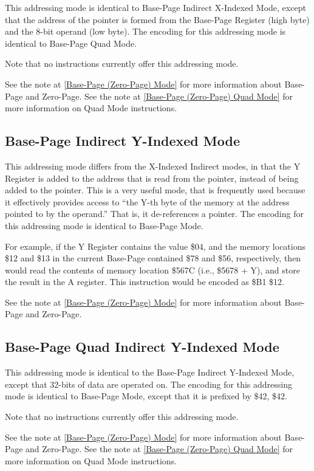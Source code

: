 This addressing mode is identical to Base-Page Indirect X-Indexed Mode, except that the address
of the pointer is formed from the Base-Page Register (high byte) and the 8-bit operand (low byte).
The encoding for this addressing mode is identical to Base-Page Quad Mode.

Note that no instructions currently offer this addressing mode.

See the note at \ref{Base-Page (Zero-Page) Mode} for more information about Base-Page and Zero-Page.
See the note at \ref{Base-Page (Zero-Page) Quad Mode} for more information on Quad Mode instructions.

\subsection{Base-Page Indirect Y-Indexed Mode}

This addressing mode differs from the X-Indexed Indirect modes, in that the Y Register is
added to the address that is read from the pointer, instead of being added to the pointer.
This is a very useful mode, that is frequently used because it effectively provides access to
``the Y-th byte of the memory at the address pointed to by the operand.'' That is, it de-references
a pointer.  
The encoding for this addressing mode is identical to Base-Page Mode.

For example, if the Y Register contains the value \$04, and the memory locations \$12 and \$13 in the current
Base-Page contained \$78 and \$56, respectively,
then  would read the contents of memory location \$567C (i.e., \$5678 + Y),
and store the result in the A register. This instruction would be encoded as \$B1 \$12.

See the note at \ref{Base-Page (Zero-Page) Mode} for more information about Base-Page and Zero-Page.

\subsection{Base-Page Quad Indirect Y-Indexed Mode}

This addressing mode is identical to the Base-Page Indirect Y-Indexed Mode, except that
32-bits of data are operated on. The encoding for this addressing mode is identical to
Base-Page Mode, except that it is prefixed by \$42, \$42.

Note that no instructions currently offer this addressing mode.

See the note at \ref{Base-Page (Zero-Page) Mode} for more information about Base-Page and Zero-Page.
See the note at \ref{Base-Page (Zero-Page) Quad Mode} for more information on Quad Mode instructions.

